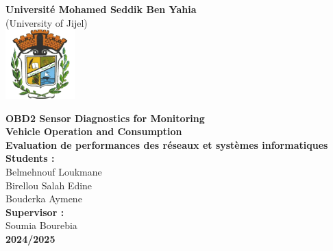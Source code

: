 \documentclass[12pt,a4paper]{article}
\begin{document}
\begin{titlepage}
    \begin{center}
        \vspace*{1cm}

        {\LARGE \textbf{Universit\'e Mohamed Seddik Ben Yahia}} \\[0.5cm]
        (University of Jijel)\\[0.5cm]

        
        \includegraphics[width=0.2\textwidth]{Logo.png}

        \vspace{1.5cm}

        {\Huge \textbf{OBD2 Sensor Diagnostics for Monitoring \\ Vehicle Operation and Consumption}} \\[1.5cm]

        {\Large \textbf{Evaluation de performances des r\'eseaux et syst\`emes informatiques}} \\[1.5cm]

        {\Large \textbf{Students :}} \\[0.5cm]
        {\Large Belmehnouf Loukmane} \\[0.2cm]
        {\Large Birellou Salah Edine} \\[0.2cm]
        {\Large Bouderka Aymene} \\[1.5cm]

        {\Large \textbf{Supervisor :}} \\[0.5cm]
        {\Large Soumia Bourebia} \\[1.5cm]
        
        {\Large \textbf{2024/2025}}

    \end{center}
\end{titlepage}
\end{document}
